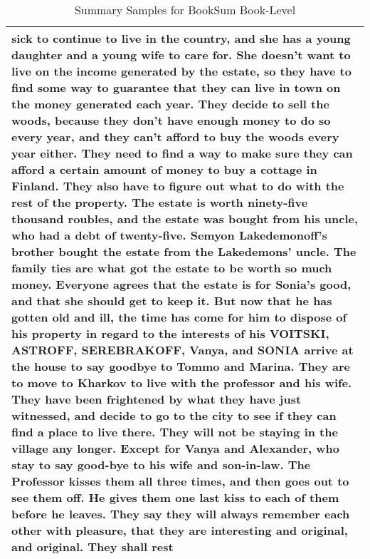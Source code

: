 \begin{table}[!htbp]
\begin{tabular}{p{\linewidth}}
sick to continue to live in the country, and she has a young daughter and a young wife to care for. She doesn't want to live on the income generated by the estate, so they have to find some way to guarantee that they can live in town on the money generated each year. They decide to sell the woods, because they don't have enough money to do so every year, and they can't afford to buy the woods every year either. They need to find a way to make sure they can afford a certain amount of money to buy a cottage in Finland. They also have to figure out what to do with the rest of the property. The estate is worth ninety-five thousand roubles, and the estate was bought from his uncle, who had a debt of twenty-five. Semyon Lakedemonoff's brother bought the estate from the Lakedemons' uncle. The family ties are what got the estate to be worth so much money. Everyone agrees that the estate is for Sonia's good, and that she should get to keep it. But now that he has gotten old and ill, the time has come for him to dispose of his property in regard to the interests of his VOITSKI, ASTROFF, SEREBRAKOFF, Vanya, and SONIA arrive at the house to say goodbye to Tommo and Marina. They are to move to Kharkov to live with the professor and his wife. They have been frightened by what they have just witnessed, and decide to go to the city to see if they can find a place to live there. They will not be staying in the village any longer. Except for Vanya and Alexander, who stay to say good-bye to his wife and son-in-law. The Professor kisses them all three times, and then goes out to see them off. He gives them one last kiss to each of them before he leaves. They say they will always remember each other with pleasure, that they are interesting and original, and original. They shall rest
    \\
    \bottomrule
    \end{tabular}
    \caption{
    Summary Samples for BookSum Book-Level
    }
\end{table}

